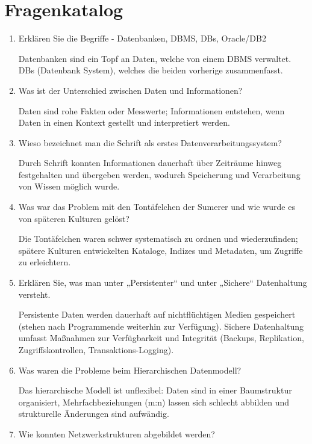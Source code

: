 \documentclass[a4paper]{article}
\title{\docTitle}
\author{Moritz}
\date{\today}
\begin{document}
\maketitle

\section*{Fragenkatalog}

\begin{enumerate}
    \item Erklären Sie die Begriffe - Datenbanken, DBMS, DBs, Oracle/DB2
    
    Datenbanken sind ein Topf an Daten, welche von einem DBMS verwaltet. DBs (Datenbank System), welches die beiden vorherige zusammenfasst.
    \item Was ist der Unterschied zwischen Daten und Informationen?
    
    Daten sind rohe Fakten oder Messwerte; Informationen entstehen, wenn Daten in einen Kontext gestellt und interpretiert werden.
    \item Wieso bezeichnet man die Schrift als erstes Datenverarbeitungssystem?
    
    Durch Schrift konnten Informationen dauerhaft über Zeiträume hinweg festgehalten und übergeben werden, wodurch Speicherung und Verarbeitung von Wissen möglich wurde.
    \item Was war das Problem mit den Tontäfelchen der Sumerer und wie wurde es von späteren Kulturen gelöst?
    
    Die Tontäfelchen waren schwer systematisch zu ordnen und wiederzufinden; spätere Kulturen entwickelten Kataloge, Indizes und Metadaten, um Zugriffe zu erleichtern.
    \item Erklären Sie, was man unter „Persistenter“ und unter „Sichere“ Datenhaltung versteht.
    
    Persistente Daten werden dauerhaft auf nichtflüchtigen Medien gespeichert (stehen nach Programmende weiterhin zur Verfügung). Sichere Datenhaltung umfasst Maßnahmen zur Verfügbarkeit und Integrität (Backups, Replikation, Zugriffskontrollen, Transaktions-Logging).
    \item Was waren die Probleme beim Hierarchischen Datenmodell?
    
    Das hierarchische Modell ist unflexibel: Daten sind in einer Baumstruktur organisiert, Mehrfachbeziehungen (m:n) lassen sich schlecht abbilden und strukturelle Änderungen sind aufwändig.
    \item Wie konnten Netzwerkstrukturen abgebildet werden?
    

\end{enumerate}
\end{document}
